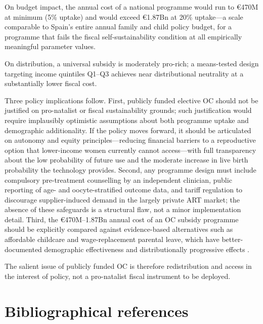 \documentclass[12pt,a4paper]{article}
\begin{document}
On budget impact, the annual cost of a national programme would run to
\euro{}470M at minimum (5\% uptake) and would exceed \euro{}1.87Bn at
20\% uptake---a scale comparable to Spain's entire annual family and
child policy budget, for a programme that fails the fiscal
self-sustainability condition at all empirically meaningful parameter
values.

On distribution, a universal subsidy is moderately pro-rich; a
means-tested design targeting income quintiles Q1--Q3 achieves near
distributional neutrality at a substantially lower fiscal cost.

Three policy implications follow. First, publicly funded elective OC
should not be justified on pro-natalist or fiscal sustainability
grounds; such justification would require implausibly optimistic
assumptions about both programme uptake and demographic additionality.
If the policy moves forward, it should be articulated on autonomy and
equity principles---reducing financial barriers to a reproductive
option that lower-income women currently cannot access---with full
transparency about the low probability of future use and the moderate
increase in live birth probability the technology provides.
Second, any programme design must include compulsory pre-treatment
counselling by an independent clinician, public reporting of age- and
oocyte-stratified outcome data, and tariff regulation to discourage
supplier-induced demand in the largely private ART market; the absence
of these safeguards is a structural flaw, not a minor implementation
detail. Third, the \euro{}470M--1.87Bn annual cost of an OC subsidy
programme should be explicitly compared against evidence-based
alternatives such as affordable childcare and wage-replacement parental
leave, which have better-documented demographic effectiveness and
distributionally progressive effects \citep{gauthier2007,rindfuss2010}.

The salient issue of publicly funded OC is therefore redistribution
and access in the interest of policy, not a pro-natalist fiscal
instrument to be deployed.

\clearpage
\begingroup
\small
\sloppy
\section*{Bibliographical references}
\end{document}
